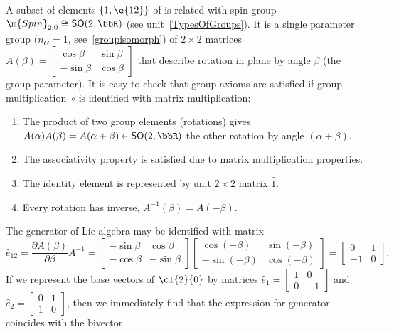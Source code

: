 \begin{example}\label{SO2R}
A subset of elements $\{1,\e{12}\}$  of   is related with
spin group $\m{Spin}_{2,0}\cong\mathsf{SO}(2,\bbR)$ (see
unit~\ref{TypesOfGroups}). It is a single parameter group
($n_G=1$, see~\ref{groupisomorph}) of $2\times 2$ matrices
$A(\beta)=\left[\begin{smallmatrix}\cos\beta&\sin\beta\\-\sin\beta&\cos\beta\end{smallmatrix}\right]$
that  describe rotation in plane by angle $\beta$ (the group parameter).
It is easy to check that group axioms are satisfied if group
multiplication~$\circ$ is identified with matrix multiplication:
\begin{enumerate}
 \item The product of two group elements (rotations)
gives $A(\alpha)A(\beta)=A(\alpha+\beta)\in\mathsf{SO}(2,\bbR)$ the
other rotation by angle $(\alpha+\beta)$.
 \item The associativity property is satisfied due to matrix multiplication properties.
 \item  The identity element is represented by unit $2\times 2$ matrix $\hat{1}$.
 \item Every rotation has inverse, $A^{-1}(\beta)=A(-\beta)$.
\end{enumerate}
The generator of Lie algebra may be identified with matrix
\[
\hat{e}_{12}=\frac{\partial A(\beta)}{\partial \beta} A^{-1}=
\begin{bmatrix}-\sin\beta&\cos\beta\\-\cos\beta&-\sin\beta\end{bmatrix}
\begin{bmatrix}\cos(-\beta)&\sin(-\beta)\\-\sin(-\beta)&\cos(-\beta)\end{bmatrix}=
\begin{bmatrix}0&1\\-1&0\end{bmatrix}.
\]
If we represent the base vectors of $\cl{2}{0}$ by matrices
$\hat{e}_{1}=\left[\begin{smallmatrix}1&0\\0&-1\end{smallmatrix}\right]$
and
$\hat{e}_{2}=\left[\begin{smallmatrix}0&1\\1&0\end{smallmatrix}\right]$,
then we immediately find that the expression for  generator
coincides with the bivector

\end{example}
